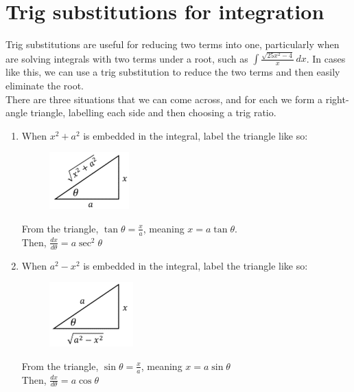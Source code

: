\documentclass[../main.tex]{subfiles}
\begin{document}
\section{Trig substitutions for integration}
Trig substitutions are useful for reducing two terms into one, particularly when are solving integrals with two terms under a root, such as \(\int \frac{\sqrt{25x^2-4}}{x}\,dx\). In cases like this, we can use a trig substitution to reduce the two terms and then easily eliminate the root.\\

There are three situations that we can come across, and for each we form a right-angle triangle, labelling each side and then choosing a trig ratio.\\

\begin{enumerate}
    \item 
    When \(x^2+a^2\) is embedded in the integral, label the triangle like so:\\
    \begin{figure}[h]
        \centering
        \includegraphics{images/trigsub1.png}
    \end{figure}

    From the triangle, \(\tan{\theta}=\frac{x}{a}\), meaning \(x=a\tan{\theta}\).\\
    Then, \(\frac{dx}{d\theta}=a\sec^2{\theta}\)\\

    \item 
    When \(a^2-x^2\) is embedded in the integral, label the triangle like so:\\
    \begin{figure}[h]
        \centering
        \includegraphics{images/trigsub2.png}
    \end{figure}

    From the triangle, \(\sin{\theta}=\frac{x}{a}\), meaning \(x=a\sin{\theta}\)\\
    Then, \(\frac{dx}{d\theta}=a\cos{\theta}\)


\end{enumerate}
\end{document}
